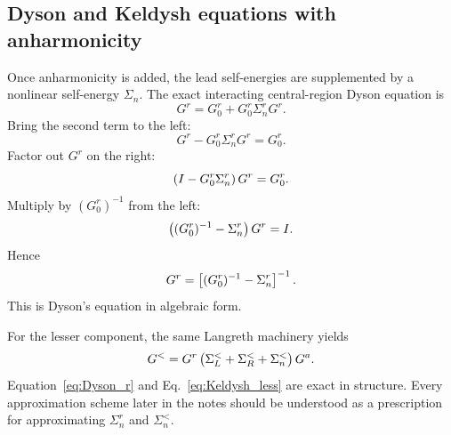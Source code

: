\subsection{Dyson and Keldysh equations with anharmonicity}
Once anharmonicity is added, the lead self-energies are supplemented by a nonlinear self-energy $\Sigma_n$. The exact interacting central-region Dyson equation is
\begin{equation}
    G^r = G_0^r + G_0^r\Sigma_n^r G^r.
    \label{eq:dyson_interacting_integral_form}
\end{equation}
Bring the second term to the left:
\begin{equation}
    G^r - G_0^r\Sigma_n^r G^r = G_0^r.
\end{equation}
Factor out $G^r$ on the right:
\begin{equation}
    \left( I - G_0^r\Sigma_n^r \right)G^r = G_0^r.
\end{equation}
Multiply by $(G_0^r)^{-1}$ from the left:
\begin{equation}
    \left( (G_0^r)^{-1} - \Sigma_n^r \right)G^r = I.
\end{equation}
Hence
\begin{equation}
    G^r = \left[ (G_0^r)^{-1} - \Sigma_n^r \right]^{-1}.
    \label{eq:Dyson_r}
\end{equation}
This is Dyson's equation in algebraic form.

For the lesser component, the same Langreth machinery yields
\begin{equation}
    G^< = G^r\left( \Sigma_L^< + \Sigma_R^< + \Sigma_n^< \right)G^a.
    \label{eq:Keldysh_less}
\end{equation}
Equation~\eqref{eq:Dyson_r} and Eq.~\eqref{eq:Keldysh_less} are exact in structure. Every approximation scheme later in the notes should be understood as a prescription for approximating $\Sigma_n^r$ and $\Sigma_n^<$.

